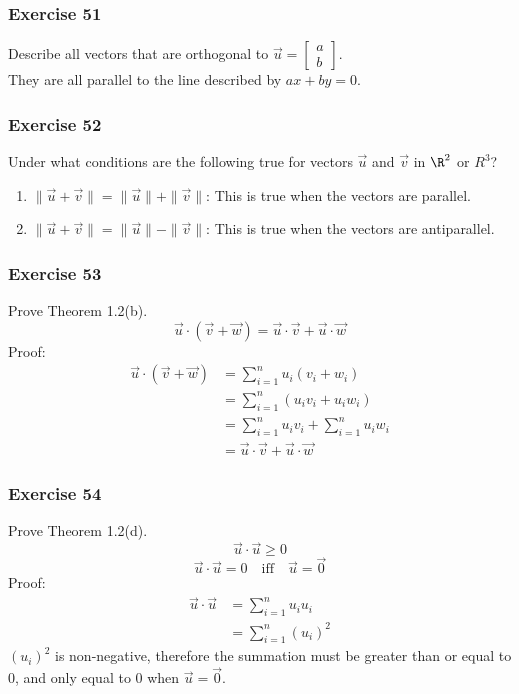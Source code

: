 \documentclass{math}
\begin{document}
\subsubsection*{Exercise 51}
Describe all vectors that are orthogonal to \( \vec{u} = \begin{bmatrix}a \\ b
\end{bmatrix} \). \\
They are all parallel to the line described by \( ax+by = 0 \).

\subsubsection*{Exercise 52}
Under what conditions are the following true for vectors \( \vec{u} \) and
\( \vec{v} \) in \( \R^2 \) or \( R^3 \)?
\begin{enumerate}
  \item \( \|\vec{u}+\vec{v}\| = \|\vec{u}\|+\|\vec{v}\| \):
    This is true when the vectors are parallel.
  \item \( \|\vec{u}+\vec{v}\| = \|\vec{u}\|-\|\vec{v}\| \):
    This is true when the vectors are antiparallel.
\end{enumerate}

\subsubsection*{Exercise 53}
Prove Theorem 1.2(b).
\[ \vec{u}\cdot(\vec{v}+\vec{w}) = \vec{u}\cdot\vec{v}+\vec{u}\cdot\vec{w} \]
Proof:
\begin{align*}
  \vec{u}\cdot(\vec{v}+\vec{w}) &= \sum_{i=1}^{n}u_{i}(v_{i}+w_{i}) \\
  &= \sum_{i=1}^{n}(u_{i}v_{i}+u_{i}w_{i}) \\
  &= \sum_{i=1}^{n}u_{i}v_{i}+\sum_{i=1}^{n}u_{i}w_{i} \\
  &= \vec{u}\cdot\vec{v}+\vec{u}\cdot\vec{w}
\end{align*}

\subsubsection*{Exercise 54}
Prove Theorem 1.2(d).
\[ \vec{u}\cdot\vec{u} \ge 0 \]
\[ \vec{u}\cdot\vec{u} = 0 \quad\text{iff}\quad \vec{u} = \vec{0} \]
Proof:
\begin{align*}
  \vec{u}\cdot\vec{u} &= \sum_{i=1}^{n}u_iu_i \\
  &= \sum_{i=1}^{n}(u_i)^{2}
\end{align*}
\( (u_i)^{2} \) is non-negative, therefore the summation must be greater than
or equal to 0, and only equal to 0 when \( \vec{u} = \vec{0} \).
\end{document}
